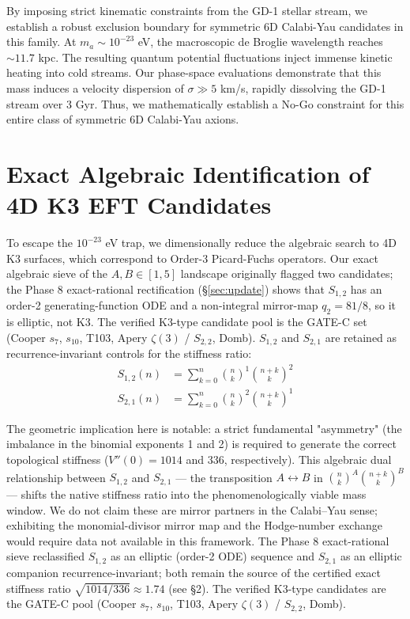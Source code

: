 \documentclass[11pt,a4paper]{article}
\begin{document}
By imposing strict kinematic constraints from the GD-1 stellar stream, we establish a robust exclusion boundary for symmetric 6D Calabi-Yau candidates in this family. At $m_a \sim 10^{-23}$ eV, the macroscopic de Broglie wavelength reaches $\sim 11.7$ kpc. The resulting quantum potential fluctuations inject immense kinetic heating into cold streams. Our phase-space evaluations demonstrate that this mass induces a velocity dispersion of $\sigma \gg 5$ km/s, rapidly dissolving the GD-1 stream over 3 Gyr. Thus, we mathematically establish a No-Go constraint for this entire class of symmetric 6D Calabi-Yau axions.

\section{Exact Algebraic Identification of 4D K3 EFT Candidates}
To escape the $10^{-23}$ eV trap, we dimensionally reduce the algebraic search to 4D K3 surfaces, which correspond to Order-3 Picard-Fuchs operators. Our exact algebraic sieve of the $A,B \in [1, 5]$ landscape originally flagged two candidates; the Phase 8 exact-rational rectification (\S\ref{sec:update}) shows that $S_{1,2}$ has an order-2 generating-function ODE and a non-integral mirror-map $q_2 = 81/8$, so it is elliptic, not K3. The verified K3-type candidate pool is the GATE-C set (Cooper $s_7$, $s_{10}$, T103, Apery $\zeta(3)$ / $S_{2,2}$, Domb). $S_{1,2}$ and $S_{2,1}$ are retained as recurrence-invariant controls for the stiffness ratio:
\begin{align}
S_{1,2}(n) &= \sum_{k=0}^n \binom{n}{k}^1 \binom{n+k}{k}^2 \\
S_{2,1}(n) &= \sum_{k=0}^n \binom{n}{k}^2 \binom{n+k}{k}^1
\end{align}

The geometric implication here is notable: a strict fundamental "asymmetry" (the imbalance in the binomial exponents 1 and 2) is required to generate the correct topological stiffness ($V''(0) = 1014$ and $336$, respectively). This algebraic dual relationship between $S_{1,2}$ and $S_{2,1}$ — the transposition $A \leftrightarrow B$ in $\binom{n}{k}^A\binom{n+k}{k}^B$ — shifts the native stiffness ratio into the phenomenologically viable mass window. We do not claim these are mirror partners in the Calabi–Yau sense; exhibiting the monomial-divisor mirror map and the Hodge-number exchange would require data not available in this framework. The Phase 8 exact-rational sieve reclassified $S_{1,2}$ as an elliptic (order-2 ODE) sequence and $S_{2,1}$ as an elliptic companion recurrence-invariant; both remain the source of the certified exact stiffness ratio $\sqrt{1014/336}\approx1.74$ (see §2). The verified K3-type candidates are the GATE-C pool (Cooper $s_7$, $s_{10}$, T103, Apery $\zeta(3)$ / $S_{2,2}$, Domb).
\end{document}
